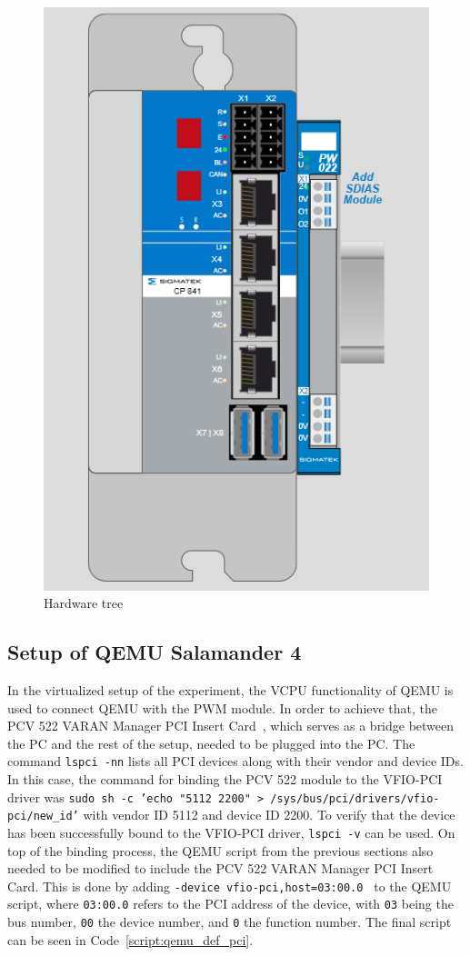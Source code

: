 \documentclass[MMR,Master,english]{twbook}
\begin{document}
\begin{figure}[H]
	\centering
	\includegraphics[width=0.5\columnwidth]{img/experiment/hardware_tree.png}
	\caption[Hardware tree]{Hardware tree}
	\label{fig:hardware_tree}
\end{figure}

\subsection{Setup of QEMU Salamander 4}
In the virtualized setup of the experiment, the VCPU functionality of QEMU is used to connect QEMU with the PWM module. In order to achieve that, the PCV 522 VARAN Manager PCI Insert Card~\cite{ControlsHMIsSIGMATEK}, which serves as a bridge between the PC and the rest of the setup, needed to be plugged into the PC. The command \texttt{lspci -nn} lists all PCI devices along with their vendor and device IDs. In this case, the command for binding the PCV 522 module to the VFIO-PCI driver was \texttt{sudo sh -c 'echo "5112 2200" > /sys/bus/pci/drivers/vfio-pci/new\_id'} with vendor ID 5112 and device ID 2200.  To verify that the device has been successfully bound to the VFIO-PCI driver, \texttt{lspci -v} can be used. On top of the binding process, the QEMU script from the previous sections also needed to be modified to include the PCV 522 VARAN Manager PCI Insert Card. This is done by adding \texttt{-device\ vfio-pci,host=03:00.0 } to the QEMU script, where \texttt{03:00.0} refers to the PCI address of the device, with \texttt{03} being the bus number, \texttt{00} the device number, and \texttt{0} the function number. The final script can be seen in Code~\ref{script:qemu_def_pci}. 
\end{document}
